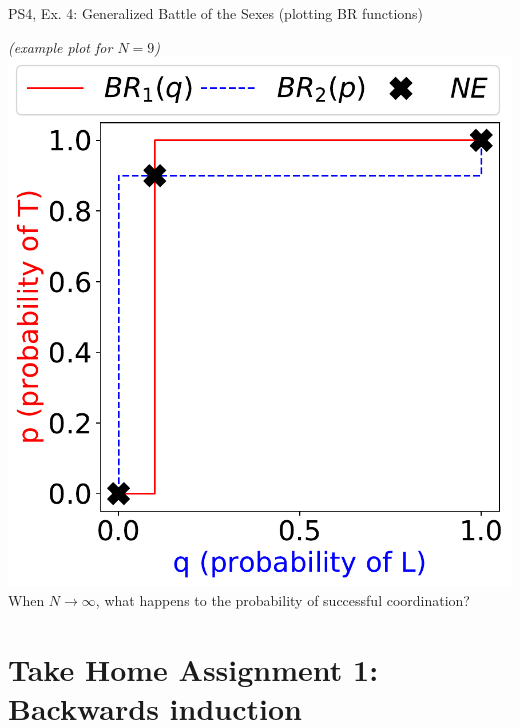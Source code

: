 \begin{frame}{PS4, Ex. 4: Generalized Battle of the Sexes (plotting BR functions)}
\begin{multicols}{2}
  \vfill\null \columnbreak
    \textit{(example plot for $N=9$)}
    \includegraphics[width=\columnwidth]{figures/4b}
    \vspace{-0pt}
    When $N\rightarrow\infty$, what happens to the probability of successful coordination?
  \vfill\null
  \end{multicols}
\end{frame}


\section{Take Home Assignment 1: Backwards induction}

